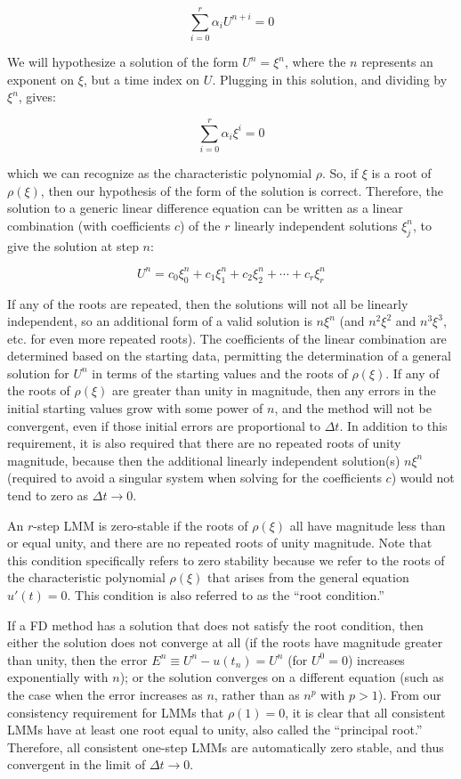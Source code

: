 \documentclass[10pt]{article}
\newcommand{\beq}{\begin{equation}}
\newcommand{\eeq}{\end{equation}}
\begin{document}
\begin{flushleft}
\beq
\sum_{i=0}^r\alpha_iU^{n+i}=0
\eeq

We will hypothesize a solution of the form \(U^n=\xi^n\), where the \(n\) represents an exponent on \(\xi\), but a time index on \(U\). Plugging in this solution, and dividing by \(\xi^n\), gives:

\beq
\sum_{i=0}^r\alpha_i\xi^i=0
\eeq

which we can recognize as the characteristic polynomial \(\rho\). So, if \(\xi\) is a root of \(\rho(\xi)\), then our hypothesis of the form of the solution is correct. Therefore, the solution to a generic linear difference equation can be written as a linear combination (with coefficients \(c\)) of the \(r\) linearly independent solutions \(\xi_j^n\), to give the solution at step \(n\):

\beq
U^n=c_0\xi_0^n+c_1\xi_1^n+c_2\xi_2^n+\cdots +c_r\xi_r^n
\eeq

If any of the roots are repeated, then the solutions will not all be linearly independent, so an additional form of a valid solution is \(n\xi^n\) (and \(n^2\xi^2\) and \(n^3\xi^3\), etc. for even more repeated roots). The coefficients of the linear combination are determined based on the starting data, permitting the determination of a general solution for \(U^n\) in terms of the starting values and the roots of \(\rho(\xi)\). If any of the roots of \(\rho(\xi)\) are greater than unity in magnitude, then any errors in the initial starting values grow with some power of \(n\), and the method will not be convergent, even if those initial errors are proportional to \(\Delta t\). In addition to this requirement, it is also required that there are no repeated roots of unity magnitude, because then the additional linearly independent solution(s) \(n\xi^n\) (required to avoid a singular system when solving for the coefficients \(c\)) would not tend to zero as \(\Delta t\rightarrow0\).

An \(r\)-step LMM is zero-stable if the roots of \(\rho(\xi)\) all have magnitude less than or equal unity, and there are no repeated roots of unity magnitude. Note that this condition specifically refers to zero stability because we refer to the roots of the characteristic polynomial \(\rho(\xi)\) that arises from the general equation \(u'(t)=0\). This condition is also referred to as the ``root condition.'' 

If a FD method has a solution that does not satisfy the root condition, then either the solution does not converge at all (if the roots have magnitude greater than unity, then the error \(E^n\equiv U^n-u(t_n)=U^n\) (for \(U^0=0\)) increases exponentially with \(n\)); or the solution converges on a different equation (such as the case when the error increases as \(n\), rather than as \(n^p\) with \(p>1\)). From our consistency requirement for LMMs that \(\rho(1)=0\), it is clear that all consistent LMMs have at least one root equal to unity, also called the ``principal root.'' Therefore, all consistent one-step LMMs are automatically zero stable, and thus convergent in the limit of \(\Delta t\rightarrow0\).


\end{flushleft}
\end{document}
